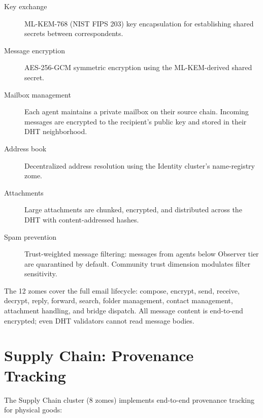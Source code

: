 \documentclass[12pt]{book}
\begin{document}
\begin{description}
  \item[Key exchange] ML-KEM-768 (NIST FIPS 203) key encapsulation for
    establishing shared secrets between correspondents.
  \item[Message encryption] AES-256-GCM symmetric encryption using the
    ML-KEM-derived shared secret.
  \item[Mailbox management] Each agent maintains a private mailbox on their
    source chain. Incoming messages are encrypted to the recipient's public
    key and stored in their DHT neighborhood.
  \item[Address book] Decentralized address resolution using the Identity
    cluster's name-registry zome.
  \item[Attachments] Large attachments are chunked, encrypted, and distributed
    across the DHT with content-addressed hashes.
  \item[Spam prevention] Trust-weighted message filtering: messages from
    agents below Observer tier are quarantined by default. Community
    trust dimension modulates filter sensitivity.
\end{description}

The 12 zomes cover the full email lifecycle: compose, encrypt, send, receive,
decrypt, reply, forward, search, folder management, contact management,
attachment handling, and bridge dispatch. All message content is
end-to-end encrypted; even DHT validators cannot read message bodies.

\section{Supply Chain: Provenance Tracking}

The Supply Chain cluster (8 zomes) implements end-to-end provenance tracking
for physical goods:
\end{document}
